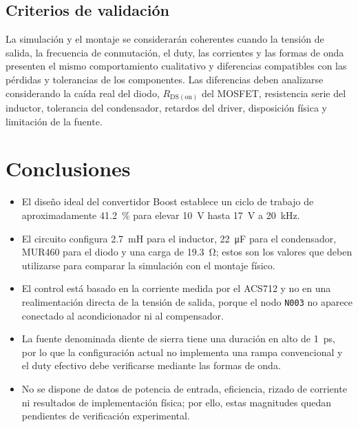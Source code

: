 \documentclass[12pt]{article}
\begin{document}
\subsection{Criterios de validación}
La simulación y el montaje se considerarán coherentes cuando la tensión de salida, la frecuencia de conmutación, el duty, las corrientes y las formas de onda presenten el mismo comportamiento cualitativo y diferencias compatibles con las pérdidas y tolerancias de los componentes. Las diferencias deben analizarse considerando la caída real del diodo, $R_{\mathrm{DS(on)}}$ del MOSFET, resistencia serie del inductor, tolerancia del condensador, retardos del driver, disposición física y limitación de la fuente.

\section{Conclusiones}
\begin{itemize}
\item El diseño ideal del convertidor Boost establece un ciclo de trabajo de aproximadamente \SI{41.2}{\percent} para elevar \SI{10}{V} hasta \SI{17}{V} a \SI{20}{kHz}.
\item El circuito configura \SI{2.7}{mH} para el inductor, \SI{22}{\micro F} para el condensador, MUR460 para el diodo y una carga de \SI{19.3}{\ohm}; estos son los valores que deben utilizarse para comparar la simulación con el montaje físico.
\item El control está basado en la corriente medida por el ACS712 y no en una realimentación directa de la tensión de salida, porque el nodo \texttt{N003} no aparece conectado al acondicionador ni al compensador.
\item La fuente denominada diente de sierra tiene una duración en alto de \SI{1}{ps}, por lo que la configuración actual no implementa una rampa convencional y el duty efectivo debe verificarse mediante las formas de onda.
\item No se dispone de datos de potencia de entrada, eficiencia, rizado de corriente ni resultados de implementación física; por ello, estas magnitudes quedan pendientes de verificación experimental.
\end{itemize}
\end{document}
